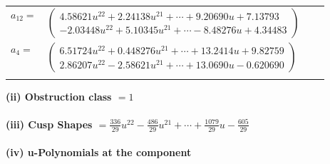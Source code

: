 \documentclass[1p]{elsarticle_modified}
\theoremstyle{definition}
\begin{document}
\begin{tabular}{m{7pt} m{180pt} m{7pt} m{180pt} }
\flushright $a_{12}=$&$\begin{pmatrix}4.58621 u^{22}+2.24138 u^{21}+\cdots+9.20690 u+7.13793\\-2.03448 u^{22}+5.10345 u^{21}+\cdots-8.48276 u+4.34483\end{pmatrix}$ \\
\flushright $a_{4}=$&$\begin{pmatrix}6.51724 u^{22}+0.448276 u^{21}+\cdots+13.2414 u+9.82759\\2.86207 u^{22}-2.58621 u^{21}+\cdots+13.0690 u-0.620690\end{pmatrix}$\\&\end{tabular}
\flushleft \textbf{(ii) Obstruction class $= 1$}\\~\\
\flushleft \textbf{(iii) Cusp Shapes $= \frac{336}{29} u^{22}-\frac{486}{29} u^{21}+\cdots+\frac{1079}{29} u-\frac{605}{29}$}\\~\\
\newpage\renewcommand{\arraystretch}{1}
\flushleft \textbf{(iv) u-Polynomials at the component}\newline \\
\end{document}
